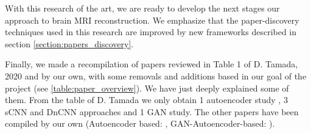 With this research of the art, we are ready to develop the next stages our approach to brain MRI reconstruction. We emphasize that the paper-discovery techniques used in this research are improved by new frameworks described in section \ref{section:papers_discovery}.

Finally, we made a recompilation of papers reviewed in Table 1 of D. Tamada, 2020 \cite{tamada2020review} and by our own, with some removals and additions based in our goal of the project (see \ref{table:paper_overview}). We have just deeply explained some of them. From the table of D. Tamada we only obtain 1 autoencoder study \cite{bermudez2018t1autoencoder}, 3 sCNN and DnCNN approaches \cite{kidoh2019scnnt1} \cite{ganHR3d} \cite{dncnnnoise2noise} and 1 GAN study.  The other papers have been compiled by our own (Autoencoder based: \cite{pinaya2019} \cite{myronenko20183d} \cite{gondara2016medicalautoencoder} \cite{superresolution} \cite{fuzzyautoencoder} \cite{learnvolrepreCODE}, GAN-Autoencoder-based: \cite{wganautoencoder}).



